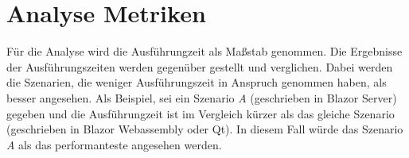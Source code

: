 \section{Analyse Metriken}
\label{sec:metriken}
Für die Analyse wird die Ausführungzeit als
Maßstab genommen. Die Ergebnisse der Ausführungszeiten werden gegenüber gestellt und
verglichen. Dabei werden die Szenarien, die weniger Ausführungszeit in Anspruch genommen haben,
als besser angesehen.
\newline
\newline
Als Beispiel, sei ein Szenario \emph{A} (geschrieben in Blazor Server) gegeben und die
Ausführungzeit ist im Vergleich kürzer als das gleiche Szenario (geschrieben in Blazor Webassembly
oder Qt). In diesem Fall würde das Szenario \emph{A} als das performanteste angesehen werden.